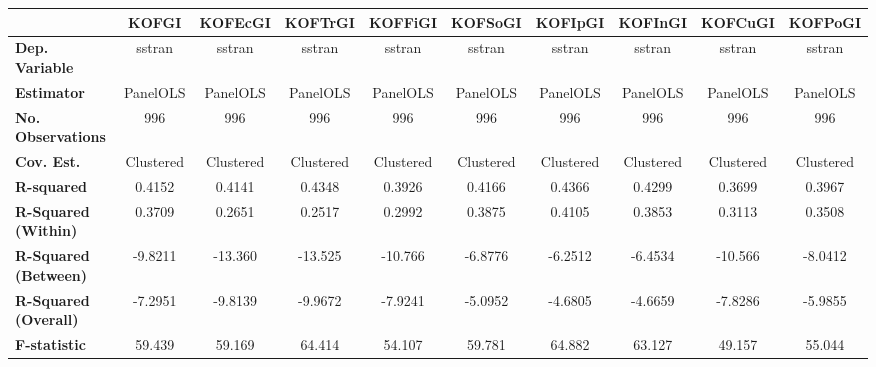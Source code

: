 \begin{center}
\begin{tabular}{lccccccccc}
\toprule
                                   & \textbf{KOFGI} & \textbf{KOFEcGI} & \textbf{KOFTrGI} & \textbf{KOFFiGI} & \textbf{KOFSoGI} & \textbf{KOFIpGI} & \textbf{KOFInGI} & \textbf{KOFCuGI} & \textbf{KOFPoGI}  \\
\midrule
\textbf{Dep. Variable}             &     sstran     &      sstran      &      sstran      &      sstran      &      sstran      &      sstran      &      sstran      &      sstran      &      sstran       \\
\textbf{Estimator}                 &    PanelOLS    &     PanelOLS     &     PanelOLS     &     PanelOLS     &     PanelOLS     &     PanelOLS     &     PanelOLS     &     PanelOLS     &     PanelOLS      \\
\textbf{No. Observations}          &      996       &       996        &       996        &       996        &       996        &       996        &       996        &       996        &       996         \\
\textbf{Cov. Est.}                 &   Clustered    &    Clustered     &    Clustered     &    Clustered     &    Clustered     &    Clustered     &    Clustered     &    Clustered     &    Clustered      \\
\textbf{R-squared}                 &     0.4152     &      0.4141      &      0.4348      &      0.3926      &      0.4166      &      0.4366      &      0.4299      &      0.3699      &      0.3967       \\
\textbf{R-Squared (Within)}        &     0.3709     &      0.2651      &      0.2517      &      0.2992      &      0.3875      &      0.4105      &      0.3853      &      0.3113      &      0.3508       \\
\textbf{R-Squared (Between)}       &    -9.8211     &     -13.360      &     -13.525      &     -10.766      &     -6.8776      &     -6.2512      &     -6.4534      &     -10.566      &     -8.0412       \\
\textbf{R-Squared (Overall)}       &    -7.2951     &     -9.8139      &     -9.9672      &     -7.9241      &     -5.0952      &     -4.6805      &     -4.6659      &     -7.8286      &     -5.9855       \\
\textbf{F-statistic}               &     59.439     &      59.169      &      64.414      &      54.107      &      59.781      &      64.882      &      63.127      &      49.157      &      55.044       \\

\end{tabular}
\end{center}
